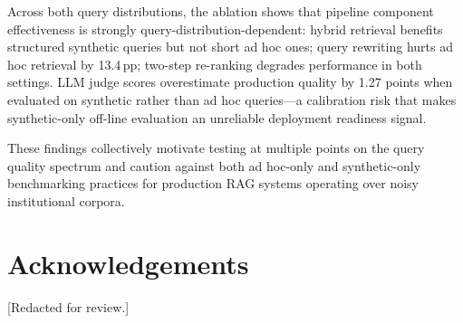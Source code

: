 \documentclass[sigconf,natbib=true]{acmart}
\begin{document}
Across both query distributions, the ablation shows that pipeline component effectiveness is strongly query-distribution-dependent: hybrid retrieval benefits structured synthetic queries but not short ad hoc ones; query rewriting hurts ad hoc retrieval by 13.4\,pp; two-step re-ranking degrades performance in both settings.
LLM judge scores overestimate production quality by 1.27 points when evaluated on synthetic rather than ad hoc queries---a calibration risk that makes synthetic-only off-line evaluation an unreliable deployment readiness signal.

These findings collectively motivate testing at multiple points on the query quality spectrum and caution against both ad hoc-only and synthetic-only benchmarking practices for production RAG systems operating over noisy institutional corpora.

\section*{Acknowledgements}
[Redacted for review.]

\balance


\end{document}
